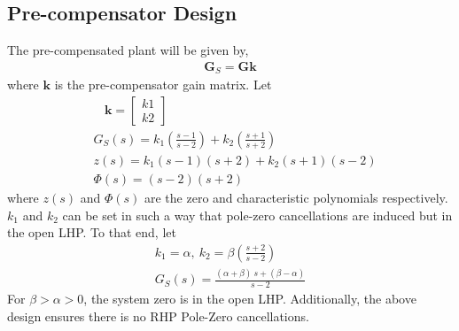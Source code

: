 \subsection{Pre-compensator Design}
The pre-compensated plant will be given by,
\begin{align*}
    \bm{G}_S = \bm{Gk}
\end{align*}
where $\mathbf{k}$ is the pre-compensator gain matrix. Let
\begin{align*}
    &\:\:\:\:\bm{k} =
    \begin{bmatrix}
        k1\\k2
    \end{bmatrix}\\
    &G_S(s) = k_1\left(\frac{s-1}{s-2}\right) + k_2\left(\frac{s+1}{s+2}\right)\\
    &z(s) = k_1(s-1)(s+2) + k_2(s+1)(s-2)\\
    &\Phi(s) = (s-2)(s+2)
\end{align*} 
where $z(s)$ and $\Phi(s)$ are the zero and characteristic polynomials respectively.
$k_1$ and $k_2$ can be set in such a way that pole-zero cancellations are induced but in the open LHP. To that end, let
\begin{align*}
    k_1 = \alpha, \: k_2 = \beta\left(\frac{s+2}{s-2}\right)\\
    G_S(s) = \frac{(\alpha + \beta)\:s + (\beta-\alpha)}{s-2} 
\end{align*}
For $\beta>\alpha>0$, the system zero is in the open LHP. Additionally, the above design ensures there is no RHP Pole-Zero cancellations.